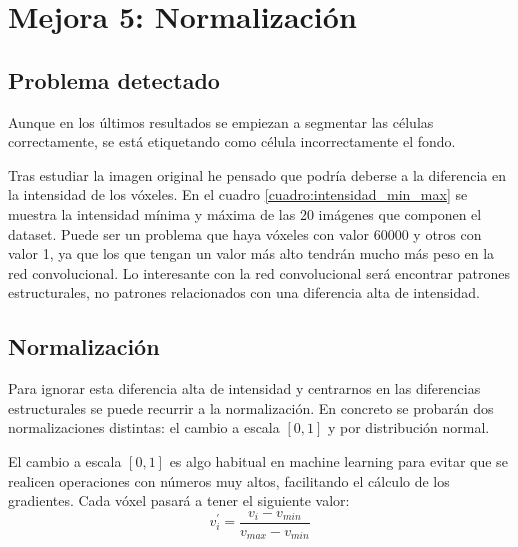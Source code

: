 \chapter{Mejora 5: Normalización}\label{znormalization}

\section{Problema detectado}\label{sec:znormalization_problem}

Aunque en los últimos resultados se empiezan a segmentar las células correctamente, se está etiquetando como célula incorrectamente el fondo.

Tras estudiar la imagen original he pensado que podría deberse a la diferencia en la intensidad de los vóxeles. En el cuadro \ref{cuadro:intensidad_min_max} se muestra la intensidad mínima y máxima de las 20 imágenes que componen el dataset. Puede ser un problema que haya vóxeles con valor 60000 y otros con valor 1, ya que los que tengan un valor más alto tendrán mucho más peso en la red convolucional. Lo interesante con la red convolucional será encontrar patrones estructurales, no patrones relacionados con una diferencia alta de intensidad.


\section{Normalización}\label{sec:normalization_techs}

Para ignorar esta diferencia alta de intensidad y centrarnos en las diferencias estructurales se puede recurrir a la normalización. En concreto se probarán dos normalizaciones distintas: el cambio a escala $[0,1]$ y por distribución normal.

El cambio a escala $[0,1]$ es algo habitual en machine learning para evitar que se realicen operaciones con números muy altos, facilitando el cálculo de los gradientes. Cada vóxel pasará a tener el siguiente valor:
\begin{equation}
v_i^{'} = \frac{v_i - v_{min}}{v_{max}-v_{min}}
\end{equation}

